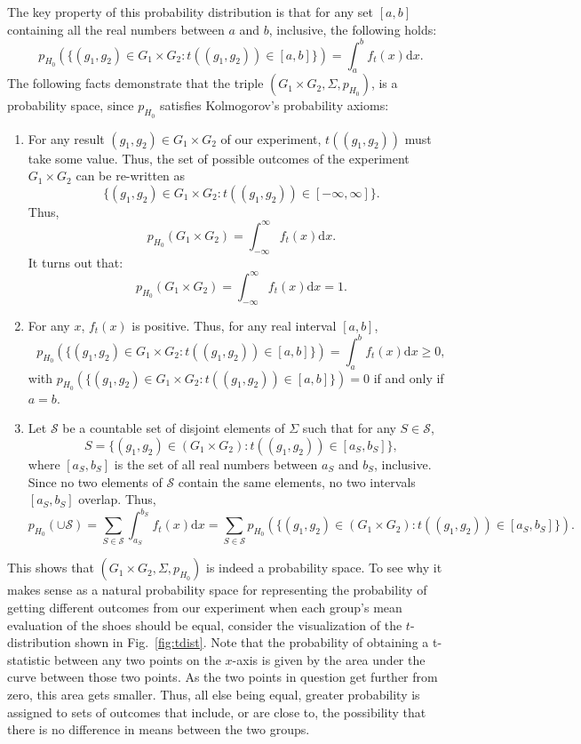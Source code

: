 \documentclass[11pt]{article}
\theoremstyle{definition}
\theoremstyle{remark}
\begin{document}
The key property of this probability distribution is that for any set $[a,b]$ containing all the real numbers between $a$ and $b$, inclusive, the following holds:
$$p_{H_{0}}\left(\{(g_{1},g_{2})\in G_{1}\times G_{2}: t((g_{1},g_{2}))\in[a,b]\}\right)=\int_{a}^{b}f_{t}(x)\textrm{d}x.$$
The following facts demonstrate that the triple $(G_{1}\times G_{2},\Sigma,p_{H_{0}})$, is a probability space, since $p_{H_{0}}$ satisfies Kolmogorov's probability axioms:
\begin{enumerate}
    \item For any result $(g_{1},g_{2})\in G_{1}\times G_{2}$ of our experiment, $t((g_{1},g_{2}))$ must take some value. Thus, the set of possible outcomes of the experiment $G_{1}\times G_{2}$ can be re-written as 
    $$\{(g_{1},g_{2})\in G_{1}\times G_{2}: t((g_{1},g_{2}))\in[-\infty,\infty]\}.$$
    Thus, 
    $$p_{H_{0}}(G_{1}\times G_{2})=\int_{-\infty}^{\infty}f_{t}(x)\textrm{d}x.$$
    It turns out that:
    $$p_{H_{0}}(G_{1}\times G_{2})=\int_{-\infty}^{\infty}f_{t}(x)\textrm{d}x=1.$$

    \item For any $x$, $f_{t}(x)$ is positive. Thus, for any real interval $[a,b]$, 
    $$p_{H_{0}}\left(\{(g_{1},g_{2})\in G_{1}\times G_{2}: t((g_{1},g_{2}))\in[a,b]\}\right)=\int_{a}^{b}f_{t}(x)\textrm{d}x\geq 0,$$
    with $p_{H_{0}}\left(\{(g_{1},g_{2})\in G_{1}\times G_{2}: t((g_{1},g_{2}))\in[a,b]\}\right)=0$ if and only if $a=b$. 

    \item Let $\mathcal{S}$ be a countable set of disjoint elements of $\Sigma$ such that for any $S\in\mathcal{S}$, $$S=\{(g_{1},g_{2})\in(G_{1}\times G_{2}):t((g_{1},g_{2}))\in[a_{S},b_{S}]\},$$
    where $[a_{S},b_{S}]$ is the set of all real numbers between $a_{S}$ and $b_{S}$, inclusive. Since no two elements of $\mathcal{S}$ contain the same elements, no two intervals $[a_{S},b_{S}]$ overlap. Thus,
    $$p_{H_{0}}(\cup\mathcal{S})=\sum_{S\in\mathcal{S}}\int_{a_{S}}^{b_{S}}f_{t}(x)\textrm{d}x=\sum_{S\in\mathcal{S}}p_{H_{0}}(\{(g_{1},g_{2})\in(G_{1}\times G_{2}):t((g_{1},g_{2}))\in[a_{S},b_{S}]\}).$$
\end{enumerate}
This shows that $(G_{1}\times G_{2},\Sigma,p_{H_{0}})$ is indeed a probability space. To see why it makes sense as a natural probability space for representing the probability of getting different outcomes from our experiment when each group's mean evaluation of the shoes should be equal, consider the visualization of the $t$-distribution shown in Fig.~\ref{fig:tdist}. Note that the probability of obtaining a t-statistic between any two points on the $x$-axis is given by the area under the curve between those two points. As the two points in question get further from zero, this area gets smaller. Thus, all else being equal, greater probability is assigned to sets of outcomes that include, or are close to, the possibility that there is no difference in means between the two groups.\par 
\end{document}

